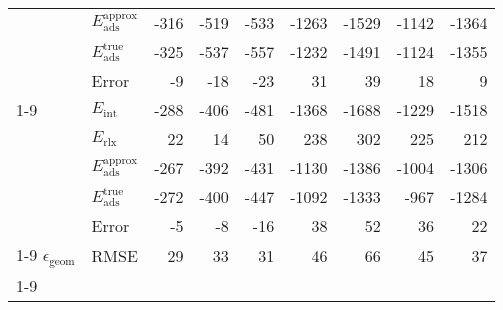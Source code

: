 \begin{longtable}{llrrrrrrr}
 & $E_\text{ads}^\text{approx}$ & -316 & -519 & -533 & -1263 & -1529 & -1142 & -1364 \\
 & $E_\text{ads}^\text{true}$ & -325 & -537 & -557 & -1232 & -1491 & -1124 & -1355 \\
 & Error & -9 & -18 & -23 & 31 & 39 & 18 & 9 \\
\cline{1-9}
\multirow[]{5}{*}{\rotatebox{90}{HSE06-D4}} & $E_\text{int}$ & -288 & -406 & -481 & -1368 & -1688 & -1229 & -1518 \\
 & $E_\text{rlx}$ & 22 & 14 & 50 & 238 & 302 & 225 & 212 \\
 & $E_\text{ads}^\text{approx}$ & -267 & -392 & -431 & -1130 & -1386 & -1004 & -1306 \\
 & $E_\text{ads}^\text{true}$ & -272 & -400 & -447 & -1092 & -1333 & -967 & -1284 \\
 & Error & -5 & -8 & -16 & 38 & 52 & 36 & 22 \\
\cline{1-9}
$\epsilon_\text{geom}$ & RMSE & 29 & 33 & 31 & 46 & 66 & 45 & 37 \\
\cline{1-9}
\end{longtable}
